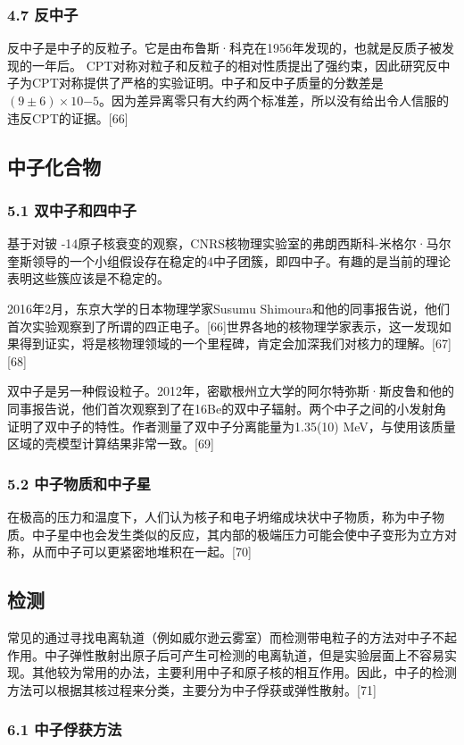 \subsubsection{4.7 反中子}
反中子是中子的反粒子。它是由布鲁斯·科克在1956年发现的，也就是反质子被发现的一年后。 CPT对称对粒子和反粒子的相对性质提出了强约束，因此研究反中子为CPT对称提供了严格的实验证明。中子和反中子质量的分数差是$(9\pm6)\times10{-5}$。因为差异离零只有大约两个标准差，所以没有给出令人信服的违反CPT的证据。[66]

\subsection{中子化合物}
\subsubsection{5.1 双中子和四中子}
基于对铍 -14原子核衰变的观察，CNRS核物理实验室的弗朗西斯科-米格尔·马尔奎斯领导的一个小组假设存在稳定的4中子团簇，即四中子。有趣的是当前的理论表明这些簇应该是不稳定的。

2016年2月，东京大学的日本物理学家Susumu Shimoura和他的同事报告说，他们首次实验观察到了所谓的四正电子。[66]世界各地的核物理学家表示，这一发现如果得到证实，将是核物理领域的一个里程碑，肯定会加深我们对核力的理解。[67][68]

双中子是另一种假设粒子。2012年，密歇根州立大学的阿尔特弥斯·斯皮鲁和他的同事报告说，他们首次观察到了在16Be的双中子辐射。两个中子之间的小发射角证明了双中子的特性。作者测量了双中子分离能量为1.35(10) MeV，与使用该质量区域的壳模型计算结果非常一致。[69]

\subsubsection{5.2 中子物质和中子星}
在极高的压力和温度下，人们认为核子和电子坍缩成块状中子物质，称为中子物质。中子星中也会发生类似的反应，其内部的极端压力可能会使中子变形为立方对称，从而中子可以更紧密地堆积在一起。[70]

\subsection{检测}
常见的通过寻找电离轨道（例如威尔逊云雾室）而检测带电粒子的方法对中子不起作用。中子弹性散射出原子后可产生可检测的电离轨道，但是实验层面上不容易实现。其他较为常用的办法，主要利用中子和原子核的相互作用。因此，中子的检测方法可以根据其核过程来分类，主要分为中子俘获或弹性散射。[71]

\subsubsection{6.1 中子俘获方法}















